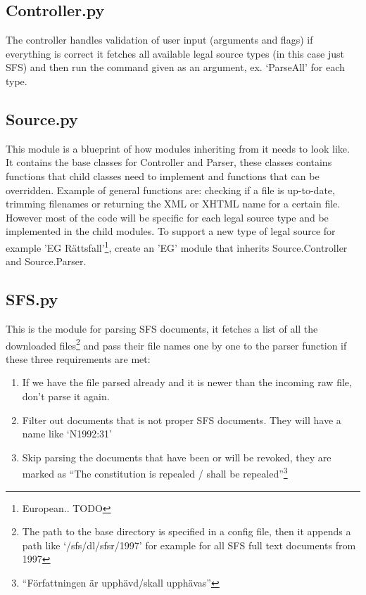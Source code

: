 \documentclass[a4paper,11pt]{kth-mag}
\begin{document}
\subsection{Controller.py}
The controller handles validation of user input (arguments and flags) if everything is correct it fetches all available legal source types (in this case just SFS) and then run the command given as an argument, ex. ‘ParseAll’ for each type.

\subsection{Source.py}
This module is a blueprint of how modules inheriting from it needs to look like. It contains the base classes for Controller and Parser, these classes contains functions that child classes need to implement and functions that can be overridden. Example of general functions are: checking if a file is up-to-date, trimming filenames or returning the XML or XHTML name for a certain file.\\
However most of the code will be specific for each legal source type and be implemented in the child modules. To support a new type of legal source for example 'EG Rättsfall'\footnote{European.. TODO}, create an 'EG' module that inherits Source.Controller and Source.Parser.

\subsection{SFS.py}
This is the module for parsing SFS documents, it fetches a list of all the downloaded files\footnote{The path to the base directory is specified in a config file, then it appends a path like ‘/sfs/dl/sfsr/1997’ for example for all SFS full text documents from 1997} and pass their file names one by one to the parser function if these three requirements are met:
\begin{enumerate}
\item If we have the file parsed already and it is newer than the incoming raw file, don't parse it again.
\item Filter out documents that is not proper SFS documents. They will have a name like ‘N1992:31’
\item Skip parsing the documents that have been or will be revoked, they are marked as “The constitution is repealed / shall be repealed”\footnote{“Författningen är upphävd/skall upphävas”}
\end{enumerate}
\end{document}
